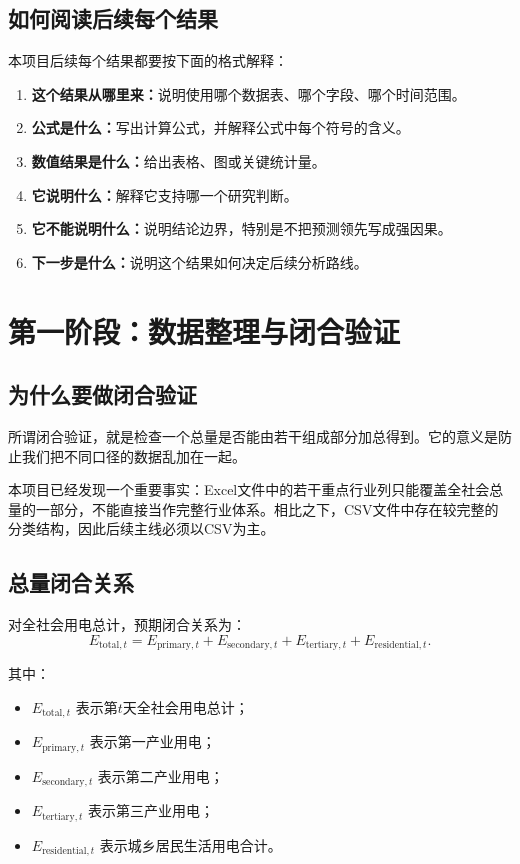 \documentclass[UTF8,a4paper,11pt]{ctexart}
\begin{document}
\subsection{如何阅读后续每个结果}

本项目后续每个结果都要按下面的格式解释：

\begin{enumerate}
  \item \textbf{这个结果从哪里来：}说明使用哪个数据表、哪个字段、哪个时间范围。
  \item \textbf{公式是什么：}写出计算公式，并解释公式中每个符号的含义。
  \item \textbf{数值结果是什么：}给出表格、图或关键统计量。
  \item \textbf{它说明什么：}解释它支持哪一个研究判断。
  \item \textbf{它不能说明什么：}说明结论边界，特别是不把预测领先写成强因果。
  \item \textbf{下一步是什么：}说明这个结果如何决定后续分析路线。
\end{enumerate}

\section{第一阶段：数据整理与闭合验证}

\subsection{为什么要做闭合验证}

所谓闭合验证，就是检查一个总量是否能由若干组成部分加总得到。它的意义是防止我们把不同口径的数据乱加在一起。

本项目已经发现一个重要事实：Excel文件中的若干重点行业列只能覆盖全社会总量的一部分，不能直接当作完整行业体系。相比之下，CSV文件中存在较完整的分类结构，因此后续主线必须以CSV为主。

\subsection{总量闭合关系}

对全社会用电总计，预期闭合关系为：
\[
E_{\mathrm{total},t}
=
E_{\mathrm{primary},t}
+
E_{\mathrm{secondary},t}
+
E_{\mathrm{tertiary},t}
+
E_{\mathrm{residential},t}.
\]

其中：
\begin{itemize}
  \item $E_{\mathrm{total},t}$ 表示第$t$天全社会用电总计；
  \item $E_{\mathrm{primary},t}$ 表示第一产业用电；
  \item $E_{\mathrm{secondary},t}$ 表示第二产业用电；
  \item $E_{\mathrm{tertiary},t}$ 表示第三产业用电；
  \item $E_{\mathrm{residential},t}$ 表示城乡居民生活用电合计。
\end{itemize}
\end{document}
